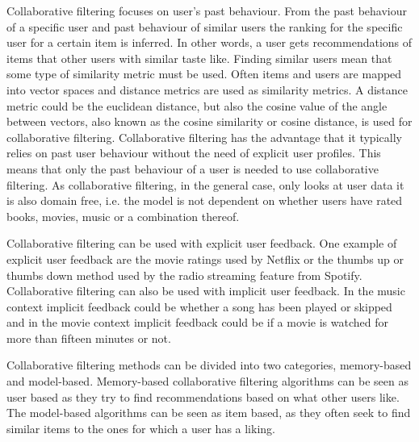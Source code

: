 \documentclass[a4paper,11pt]{kth-mag}
\begin{document}
 Collaborative filtering focuses on user's past behaviour. From the past behaviour of a specific user and past behaviour of similar users the ranking for the specific user for a certain item is inferred\cite{sarwar2001item}\cite{su2009survey}. In other words, a user gets recommendations of items that other users with similar taste like\cite{adomavicius2005toward}. Finding similar users mean that some type of similarity metric must be used. Often items and users are mapped into vector spaces and distance metrics are used as similarity metrics. A distance metric could be the euclidean distance, but also the cosine value of the angle between vectors, also known as the cosine similarity or cosine distance, is used for collaborative filtering\cite{sarwar2001item}. 
 Collaborative filtering has the advantage that it typically relies on past user behaviour without the need of explicit user profiles. This means that only the past behaviour of a user is needed to use collaborative filtering.  As collaborative filtering, in the general case, only looks at user data it is also domain free, i.e. the model is not dependent on whether users have rated books, movies, music or a combination thereof\cite{hu2008collaborative}.

Collaborative filtering can be used with explicit user feedback. One example of explicit user feedback are the movie ratings used by Netflix or the thumbs up or thumbs down method used by the radio streaming feature from Spotify. Collaborative filtering can also be used with implicit user feedback\cite{hu2008collaborative}. In the music context implicit feedback could be whether a song has been played or skipped and in the movie context implicit feedback could be if a movie is watched for more than fifteen minutes or not.

Collaborative filtering methods can be divided into two categories, memory-based and model-based. Memory-based collaborative filtering algorithms can be seen as user based as they try to find recommendations based on what other users like. The model-based algorithms can be seen as item based, as they often seek to find similar items to the ones for which a user has a liking\cite{sarwar2001item}.
\end{document}
